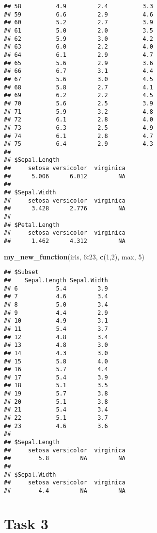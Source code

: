 \documentclass[
]{article}
\newenvironment{Shaded}{\begin{snugshade}}{\end{snugshade}}
\newcommand{\DecValTok}[1]{\textcolor[rgb]{0.00,0.00,0.81}{#1}}
\newcommand{\KeywordTok}[1]{\textcolor[rgb]{0.13,0.29,0.53}{\textbf{#1}}}
\newcommand{\NormalTok}[1]{#1}
\newcommand{\OperatorTok}[1]{\textcolor[rgb]{0.81,0.36,0.00}{\textbf{#1}}}
\begin{document}
\begin{verbatim}
## 58          4.9         2.4          3.3
## 59          6.6         2.9          4.6
## 60          5.2         2.7          3.9
## 61          5.0         2.0          3.5
## 62          5.9         3.0          4.2
## 63          6.0         2.2          4.0
## 64          6.1         2.9          4.7
## 65          5.6         2.9          3.6
## 66          6.7         3.1          4.4
## 67          5.6         3.0          4.5
## 68          5.8         2.7          4.1
## 69          6.2         2.2          4.5
## 70          5.6         2.5          3.9
## 71          5.9         3.2          4.8
## 72          6.1         2.8          4.0
## 73          6.3         2.5          4.9
## 74          6.1         2.8          4.7
## 75          6.4         2.9          4.3
## 
## $Sepal.Length
##     setosa versicolor  virginica 
##      5.006      6.012         NA 
## 
## $Sepal.Width
##     setosa versicolor  virginica 
##      3.428      2.776         NA 
## 
## $Petal.Length
##     setosa versicolor  virginica 
##      1.462      4.312         NA
\end{verbatim}

\begin{Shaded}
\begin{Highlighting}[]
\KeywordTok{my_new_function}\NormalTok{(iris, }\DecValTok{6}\OperatorTok{:}\DecValTok{23}\NormalTok{, }\KeywordTok{c}\NormalTok{(}\DecValTok{1}\NormalTok{,}\DecValTok{2}\NormalTok{), max, }\DecValTok{5}\NormalTok{)}
\end{Highlighting}
\end{Shaded}

\begin{verbatim}
## $Subset
##    Sepal.Length Sepal.Width
## 6           5.4         3.9
## 7           4.6         3.4
## 8           5.0         3.4
## 9           4.4         2.9
## 10          4.9         3.1
## 11          5.4         3.7
## 12          4.8         3.4
## 13          4.8         3.0
## 14          4.3         3.0
## 15          5.8         4.0
## 16          5.7         4.4
## 17          5.4         3.9
## 18          5.1         3.5
## 19          5.7         3.8
## 20          5.1         3.8
## 21          5.4         3.4
## 22          5.1         3.7
## 23          4.6         3.6
## 
## $Sepal.Length
##     setosa versicolor  virginica 
##        5.8         NA         NA 
## 
## $Sepal.Width
##     setosa versicolor  virginica 
##        4.4         NA         NA
\end{verbatim}

\hypertarget{task-3}{%
\section{Task 3}\label{task-3}}
\end{document}
